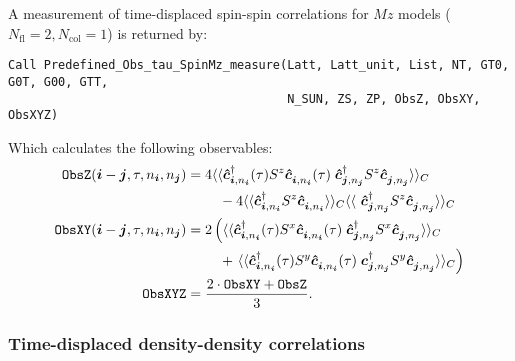 A measurement of time-displaced spin-spin correlations for $M\!z$ models ($N_\text{fl} = 2, N_\text{col} = 1$)  is returned by:
\begin{lstlisting}[style=fortran]
Call Predefined_Obs_tau_SpinMz_measure(Latt, Latt_unit, List, NT, GT0, G0T, G00, GTT,
                                       N_SUN, ZS, ZP, ObsZ, ObsXY, ObsXYZ)
\end{lstlisting}
Which calculates the following observables:
\begin{align}
\texttt{ObsZ}(\ve{i} - \ve{j}, \tau, n_{\ve{i}},  n_{\ve{j}} ) &= \begin{multlined}[t] 4 \langle \langle \ve{\hat{c}}^{\dagger}_{\ve{i}, n_{\ve{i}}}(\tau)  S^z \ve{\hat{c}}^{\phantom\dagger}_{\ve{i}, n_{\ve{i}} }(\tau)   \;  \ve{\hat{c}}^{\dagger}_{\ve{j}, n_{\ve{j}}} S^z  \ve{\hat{c}}^{\phantom\dagger}_{\ve{j}, n_{\ve{j}}}\rangle \rangle_{C} \\  
- 4 \langle \langle \ve{\hat{c}}^{\dagger}_{\ve{i}, n_{\ve{i}}} S^z \ve{\hat{c}}^{\phantom\dagger}_{\ve{i}, n_{\ve{i}} } \rangle \rangle_{C}  \langle \langle \  \ve{\hat{c}}^{\dagger}_{\ve{j}, n_{\ve{j}}} S^z  \ve{\hat{c}}^{\phantom\dagger}_{\ve{j}, n_{\ve{j}}}\rangle \rangle_{C}   \end{multlined} \nonumber \\  
\texttt{ObsXY} (\ve{i} - \ve{j}, \tau, n_{\ve{i}},  n_{\ve{j}} ) &=\begin{multlined}[t] 
2 \left( \langle \langle \ve{\hat{c}}^{\dagger}_{\ve{i}, n_{\ve{i}}}(\tau) S^x \ve{\hat{c}}^{\phantom\dagger}_{\ve{i}, n_{\ve{i}} } (\tau)  \;  \ve{\hat{c}}^{\dagger}_{\ve{j}, n_{\ve{j}}} S^x  
\ve{\hat{c}}^{\phantom\dagger}_{\ve{j}, n_{\ve{j}}}\rangle \rangle_{C}  \right.\\
+ \left. \langle \langle \ve{\hat{c}}^{\dagger}_{\ve{i}, n_{\ve{i}}}(\tau) S^y \ve{\hat{c}}^{\phantom\dagger}_{\ve{i}, n_{\ve{i}} }(\tau)   \;  \ve{c}^{\dagger}_{\ve{j}, n_{\ve{j}}} S^y  \ve{\hat{c}}^{\phantom\dagger}_{\ve{j}, n_{\ve{j}}}\rangle \rangle_{C}  \right)  \end{multlined}  \nonumber \\
\texttt{ObsXYZ} &= \frac{2\cdot\texttt{ObsXY} + \texttt{ObsZ}}{3}.
\end{align}


\subsubsection{Time-displaced density-density correlations}

